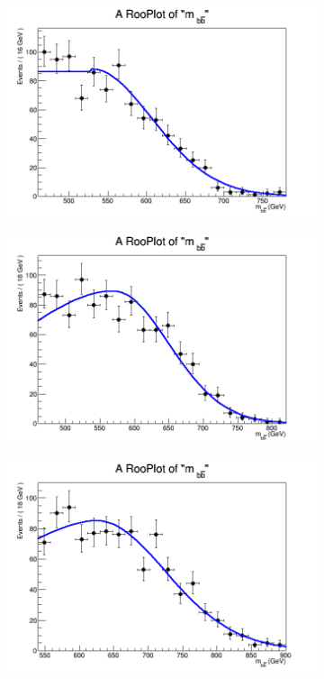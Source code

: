 \begin{figure}[phtb!]
\begin{center}
  \begin{subfigure}[$m_{A}=650$ GeV]{0.4\textwidth}\includegraphics[width=\textwidth]{FitResults/images/fitMC_bAbb650_6.png}\end{subfigure}
  \begin{subfigure}[$m_{A}=700$ GeV]{0.4\textwidth}\includegraphics[width=\textwidth]{FitResults/images/fitMC_bAbb700_6.png}\end{subfigure}
  \begin{subfigure}[$m_{A}=800$ GeV]{0.4\textwidth}\includegraphics[width=\textwidth]{FitResults/images/fitMC_bAbb800_6.png}\end{subfigure}

\end{center}
\end{figure}
